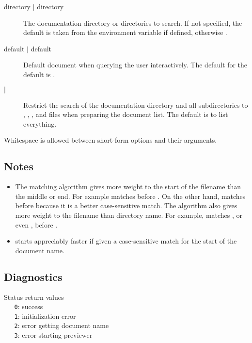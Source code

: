 \begin{description}
\item[ directory $\mid$ directory]
   The documentation directory or directories to search.  If not specified,
   the default is taken from the  environment variable if
   defined, otherwise .

\item[ default $\mid$ default]
   Default document when querying the user interactively.  The default for the
   default is .

\item[ $\mid$ ]
   Restrict the search of the documentation directory and all subdirectories
   to , , , and  files when
   preparing the document list.  The default is to list everything.
\end{description}

\noindent
Whitespace is allowed between short-form options and their arguments.

\subsection*{Notes}

\begin{itemize}
\item
   The matching algorithm gives more weight to the start of the filename than
   the middle or end.  For example  matches  before
   .  On the other hand,  matches  before
    because it is a better case-sensitive match.  The algorithm
   also gives more weight to the filename than directory name.  For example,
    matches , or even , before
   .

\item
    starts appreciably faster if given a case-sensitive match for the
   start of the document name.
\end{itemize}

\subsection*{Diagnostics}

Status return values
\\ \verb+   0+:  success
\\ \verb+   1+:  initialization error
\\ \verb+   2+:  error getting document name
\\ \verb+   3+:  error starting previewer

